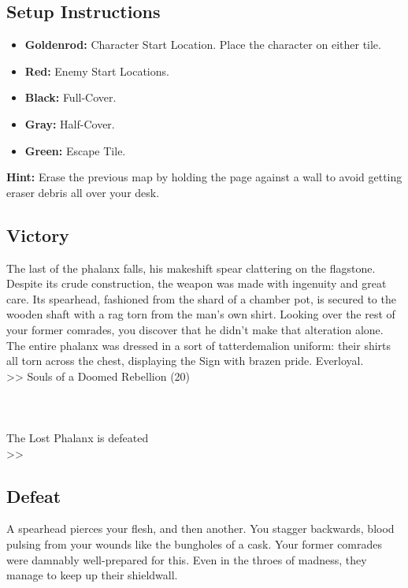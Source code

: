 \subsection*{Setup Instructions}
\begin{itemize}
\item \textbf{Goldenrod:} Character Start Location. Place the character on either tile.
\item \textbf{Red:} Enemy Start Locations.
\item \textbf{Black:} Full-Cover.
\item \textbf{Gray:} Half-Cover.
\item \textbf{Green:} Escape Tile.
\end{itemize}

\begin{tcolorbox}
\textbf{Hint:} Erase the previous map by holding the page against a wall to avoid getting eraser debris all over your desk.
\end{tcolorbox}

\pagebreak

\subsection*{Victory}
The last of the phalanx falls, his makeshift spear clattering on the flagstone. Despite its crude construction, the weapon was made with ingenuity and great care. Its spearhead, fashioned from the shard of a chamber pot, is secured to the wooden shaft with a rag torn from the man’s own shirt. Looking over the rest of your former comrades, you discover that he didn’t make that alteration alone. The entire phalanx was dressed in a sort of tatterdemalion uniform: their shirts all torn across the chest, displaying the Sign with brazen pride. Everloyal.\\

>> Souls of a Doomed Rebellion (20)\\
\\
\\
\\
 The Lost Phalanx is defeated\\
>> 

\subsection*{Defeat}
A spearhead pierces your flesh, and then another. You stagger backwards, blood pulsing from your wounds like the bungholes of a cask. Your former comrades were damnably well-prepared for this. Even in the throes of madness, they manage to keep up their shieldwall.\\


